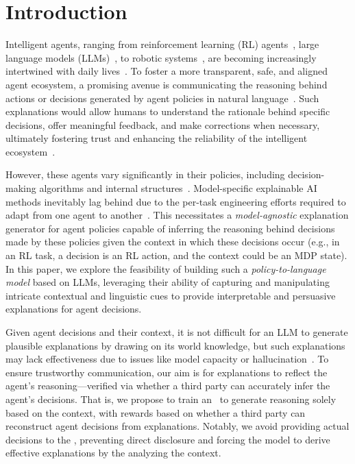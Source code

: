 
\section{Introduction}


Intelligent agents, ranging from reinforcement learning (RL) agents~\cite{kiran2021deep,zhao2021consciousness,liu2024learning,qiu2024instructing}, large language models (LLMs)~\cite{yao2022react,shinn2024reflexion,wang2023voyager,kang2020incorporating}, to robotic systems~\cite{ismail2018survey}, are becoming increasingly intertwined with daily lives~\cite{survey2024wang}. To foster a more transparent, safe, and aligned agent ecosystem, a promising avenue is communicating the reasoning behind actions or decisions generated by agent policies in natural language~\cite{lazaridou2016multi}. Such explanations would allow humans to understand the rationale behind specific decisions, offer meaningful feedback, and make corrections when necessary, ultimately fostering trust and enhancing the reliability of the intelligent ecosystem~\cite{cambria2023survey}.

However, these agents vary significantly in their policies, including decision-making algorithms and internal structures~\cite{bulling2014survey,wang2024survey}. Model-specific explainable AI methods inevitably lag behind due to the per-task engineering efforts required to adapt from one agent to another~\cite{rai2020explainable}. This necessitates a \emph{model-agnostic} explanation generator for agent policies capable of inferring the reasoning behind decisions made by these policies given the context in which these decisions occur (e.g., in an RL task, a decision is an RL action, and the context could be an MDP state). In this paper, we explore the feasibility of building such a \emph{policy-to-language model} based on LLMs, leveraging their ability of capturing and manipulating intricate contextual and linguistic cues to provide interpretable and persuasive explanations for agent decisions.

Given agent decisions and their context, it is not difficult for an LLM to generate plausible explanations by drawing on its world knowledge, but such explanations may lack effectiveness due to issues like model capacity or hallucination~\cite{ji2023towards, ganguli2022red}. To ensure trustworthy communication, our aim is for explanations to reflect the agent's reasoning---verified via whether a third party can accurately infer the agent's decisions. That is, we propose to train an \elm~to generate reasoning solely based on the context, with rewards based on whether a third party can reconstruct agent decisions from explanations. Notably, we avoid providing actual decisions to the \elm, preventing direct disclosure and forcing the model to derive effective explanations by the analyzing the context.

